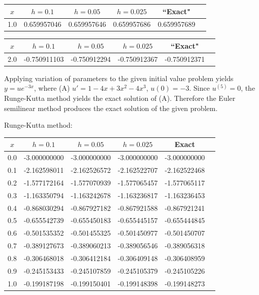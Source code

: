 {\small
{}
\begin{tabular}{|c|r|r|r|r|r|}
\hline
\multicolumn{1}{|c|}{$x$}&
\multicolumn{1}{|c|}{$h=0.1$}&
\multicolumn{1}{|c|}{$h=0.05$}&
\multicolumn{1}{|c|}{$h=0.025$}&
\multicolumn{1}{|c|}{``Exact"}\\ \hline
1.0 & 0.659957046 & 0.659957646 & 0.659957686 & 0.659957689 \\
\hline
\end{tabular}}\bigskip

{\small
{}
\begin{tabular}{|c|r|r|r|r|r|}
\hline
\multicolumn{1}{|c|}{$x$}&
\multicolumn{1}{|c|}{$h=0.1$}&
\multicolumn{1}{|c|}{$h=0.05$}&
\multicolumn{1}{|c|}{$h=0.025$}&
\multicolumn{1}{|c|}{``Exact"}\\ \hline
2.0 & -0.750911103 & -0.750912294 & -0.750912367 & -0.750912371 \\
\hline
\end{tabular}}\bigskip

Applying variation of parameters to the given initial value problem
yields $y=ue^{-3x}$, where (A) $u'=1-4x+3x^2-4x^3$, $u(0)=-3$.
Since $u^{(5)}=0$, the Runge-Kutta method yields the exact solution
of (A).  Therefore the Euler semilinear method produces the exact
solution of the given problem.

{\small Runge-Kutta method:
\begin{tabular}{|c|r|r|r|r|r|}
\hline
\multicolumn{1}{|c|}{$x$}&
\multicolumn{1}{|c|}{$h=0.1$}&
\multicolumn{1}{|c|}{$h=0.05$}&
\multicolumn{1}{|c|}{$h=0.025$}&
\multicolumn{1}{|c|}{Exact}\\ \hline
0.0 & -3.000000000 & -3.000000000 & -3.000000000 & -3.000000000 \\
0.1 & -2.162598011 & -2.162526572 & -2.162522707 & -2.162522468 \\
0.2 & -1.577172164 & -1.577070939 & -1.577065457 & -1.577065117 \\
0.3 & -1.163350794 & -1.163242678 & -1.163236817 & -1.163236453 \\
0.4 & -0.868030294 & -0.867927182 & -0.867921588 & -0.867921241 \\
0.5 & -0.655542739 & -0.655450183 & -0.655445157 & -0.655444845 \\
0.6 & -0.501535352 & -0.501455325 & -0.501450977 & -0.501450707 \\
0.7 & -0.389127673 & -0.389060213 & -0.389056546 & -0.389056318 \\
0.8 & -0.306468018 & -0.306412184 & -0.306409148 & -0.306408959 \\
0.9 & -0.245153433 & -0.245107859 & -0.245105379 & -0.245105226 \\
1.0 & -0.199187198 & -0.199150401 & -0.199148398 & -0.199148273 \\
\hline
\end{tabular}}\bigskip



